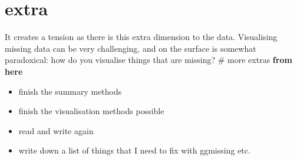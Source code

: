 \documentclass[]{article}
\providecommand{\tightlist}{%
  \setlength{\itemsep}{0pt}\setlength{\parskip}{0pt}}
\begin{document}
\section{extra}\label{extra}

It creates a tension as there is this extra dimension to the data.
Visualising missing data can be very challenging, and on the surface is
somewhat paradoxical: how do you visualise things that are missing? \#
more extras \textbf{from here}

\begin{itemize}
\tightlist
\item
  finish the summary methods
\item
  finish the visualisation methods possible
\item
  read and write again
\item
  write down a list of things that I need to fix with ggmissing etc.
\end{itemize}
\end{document}
